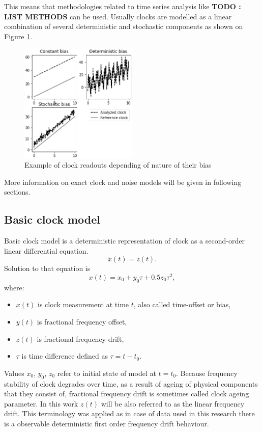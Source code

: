 This means that methodologies related to time series analysis like \textbf{TODO : LIST METHODS}
can be used.
Usually clocks are modelled as a linear combination of several deterministic and stochastic 
components as shown on Figure \ref{fig:clocks_example}. 
\begin{figure}[htb] 
	\label{fig:clocks_example}
	\centering
	\includegraphics[width=0.5\textwidth]{figures/bias_examples}
	\caption{Example of clock readouts depending of nature of their bias}
\end{figure}
More information on exact clock and noise models will be given in following sections.

\subsection{Basic clock model}
Basic clock model is a deterministic representation of clock as a second-order linear differential
equation.
\begin{equation}
	\label{equ:basic_clock}
	\ddot{x}(t)=z(t).
\end{equation}
Solution to that equation is
\begin{equation}
	\label{equ:basic_clock_solved}
	x(t)=x_{0}+y_{0}\tau+0.5z_{0}\tau^{2},
\end{equation}
where:
\begin{itemize}
	\item $x(t)$ is clock measurement at time $t$, also called time-offset or bias,
	\item $y(t)$ is fractional frequency offset,
	\item $z(t)$ is fractional frequency drift,
	\item $\tau$ is time difference defined as $\tau = t-t_{0}$.
\end{itemize}
Values $x_{0}$, $y_{0}$, $z_{0}$ refer to initial state of model at $t=t_{0}$.
Because frequency stability of clock degrades over time, as a result of ageing of physical 
components that they consist of, fractional frequency drift is sometimes called clock 
ageing parameter.
In this work $z(t)$ will be also referred to as the linear frequency drift. This terminology
was applied as in case of data used in this research there is a observable deterministic 
first order frequency drift behaviour.

